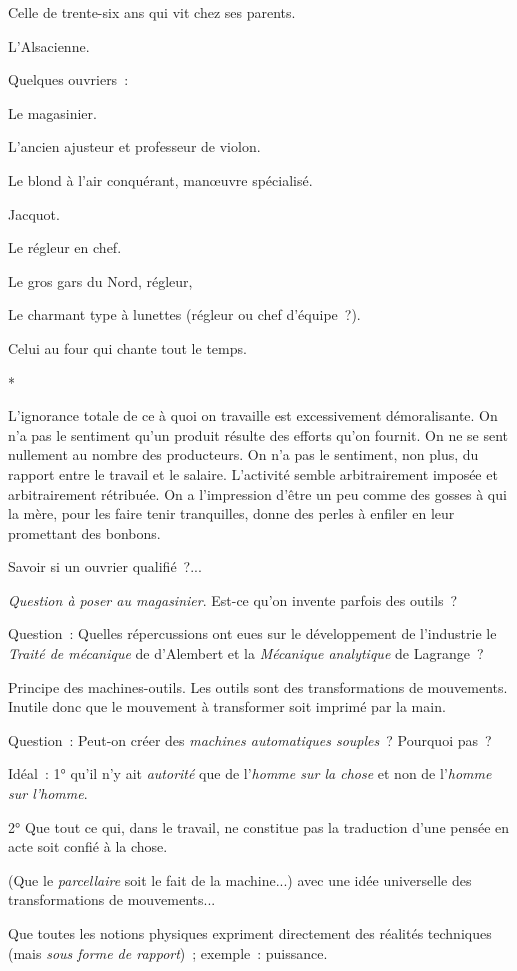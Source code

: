 \documentclass[french,twoside]{book} %
\begin{document}
Celle de trente-six ans qui vit chez ses parents.\par
L'Alsacienne.\par
Quelques ouvriers :\par
Le magasinier.\par
L'ancien ajusteur et professeur de violon.\par
Le blond à l'air conquérant, manœuvre spécialisé.\par
Jacquot.\par
Le régleur en chef.\par
Le gros gars du Nord, régleur,\par
Le charmant type à lunettes (régleur ou chef d'équipe ?).\par
Celui au four qui chante tout le temps.\par

\begin{center}
*\end{center}
\noindent L'ignorance totale de ce à quoi on travaille est excessivement démoralisante. On n'a pas le sentiment qu'un produit résulte des efforts qu'on fournit. On ne se sent nullement au nombre des producteurs. On n'a pas le sentiment, non plus, du rapport entre le travail et le salaire. L'activité semble arbitrairement imposée et arbitrairement rétribuée. On a l'impression d'être un peu comme des gosses à qui la mère, pour les faire tenir tranquilles, donne des perles à enfiler en leur promettant des bonbons.\par
Savoir si un ouvrier qualifié ?...\par
{\itshape Question à poser au magasinier}. Est-ce qu'on invente parfois des outils ?\par
Question : Quelles répercussions ont eues sur le développement de l'industrie le {\itshape Traité de mécanique} de d'Alembert et la {\itshape Mécanique analytique} de Lagrange ?\par
Principe des machines-outils. Les outils sont des transformations de mouvements. Inutile donc que le mouvement à transformer soit imprimé par la main.\par
Question : Peut-on créer des {\itshape machines automatiques souples} ? Pourquoi pas ?\par
Idéal : 1° qu'il n'y ait {\itshape autorité} que de l'{\itshape homme sur la chose} et non de l'{\itshape homme sur l'homme}.\par
2° Que tout ce qui, dans le travail, ne constitue pas la traduction d'une pensée en acte soit confié à la chose.\par
(Que le {\itshape parcellaire} soit le fait de la machine...) avec une idée universelle des transformations de mouvements...\par
Que toutes les notions physiques expriment directement des réalités techniques (mais {\itshape sous forme de rapport}) ; exemple : puissance.\par
\end{document}
